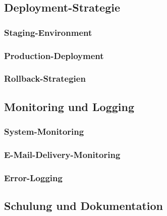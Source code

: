 \documentclass[11pt,a4paper]{article}
\begin{document}
\subsection{Deployment-Strategie}

\subsubsection{Staging-Environment}

\subsubsection{Production-Deployment}

\subsubsection{Rollback-Strategien}

\subsection{Monitoring und Logging}

\subsubsection{System-Monitoring}

\subsubsection{E-Mail-Delivery-Monitoring}

\subsubsection{Error-Logging}

\subsection{Schulung und Dokumentation}
\end{document}
